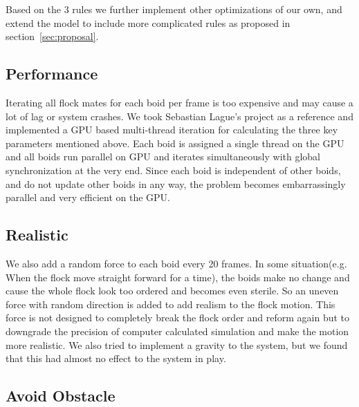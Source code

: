 Based on the 3 rules we further implement other optimizations of our own, and extend the model to include more complicated rules as proposed in section~\ref{sec:proposal}. 
\subsection{Performance}
Iterating all flock mates for each boid per frame is too expensive and may cause a lot of lag or system crashes. We took Sebastian Lague’s project as a reference and implemented a GPU based multi-thread iteration for calculating the three key parameters mentioned above. Each boid is assigned a single thread on the GPU and all boids run parallel on GPU and iterates simultaneously with global synchronization at the very end. Since each boid is independent of other boids, and do not update other boids in any way, the problem becomes embarrassingly parallel and very efficient on the GPU.

\subsection{Realistic}
We also add a random force to each boid every 20 frames. In some situation(e.g. When the flock move straight forward for a time), the boids make no change and cause the whole flock look too ordered and becomes even sterile. So an uneven force with random direction is added to add realism to the flock motion. This force is not designed to completely break the flock order and reform again but to downgrade the precision of computer calculated simulation and make the motion more realistic. We also tried to implement a gravity to the system, but we found that this had almost no effect to the system in play.

\subsection{Avoid Obstacle}

